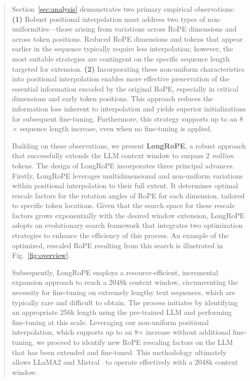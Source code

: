 \begin{abstract}
Section~\ref{sec:analysis} demonstrates two primary empirical observations: \textbf{(1)} Robust positional interpolation must address two types of non-uniformities—those arising from variations across RoPE dimensions and across token positions. Reduced RoPE dimensions and tokens that appear earlier in the sequence typically require less interpolation; however, the most suitable strategies are contingent on the specific sequence length targeted for extension. 
\textbf{(2)} Incorporating these non-uniform characteristics into positional interpolation enables more effective preservation of the essential information encoded by the original RoPE, especially in critical dimensions and early token positions. This approach reduces the information loss inherent to interpolation and yields superior initializations for subsequent fine-tuning. Furthermore, this strategy supports up to an 8$\times$ sequence length increase, even when no fine-tuning is applied.

Building on these observations, we present \textbf{LongRoPE}, a robust approach that successfully extends the LLM context window to surpass 2 \emph{million} tokens. The design of LongRoPE incorporates three principal advances. Firstly, {LongRoPE} leverages multidimensional and non-uniform variations within positional interpolation to their full extent. It determines optimal rescale factors for the rotation angles of RoPE for each dimension, tailored to specific token locations. Given that the search space for these rescale factors grows exponentially with the desired window extension, {LongRoPE} adopts an evolutionary search framework that integrates two optimization strategies to enhance the efficiency of this process. An example of the optimized, rescaled RoPE resulting from this search is illustrated in Fig.~\ref{fig:overview}.

Subsequently, {LongRoPE} employs a resource-efficient, incremental expansion approach to reach a 2048k context window, circumventing the necessity for fine-tuning on extremely lengthy text sequences, which are typically rare and difficult to obtain. The process initiates by identifying an appropriate 256k length using the pre-trained LLM and performing fine-tuning at this scale. Leveraging our non-uniform positional interpolation, which supports up to an 8$\times$ increase without additional fine-tuning, we proceed to identify new RoPE rescaling factors on the LLM that has been extended and fine-tuned. This methodology ultimately allows LLaMA2 and Mistral~\cite{mistral} to operate effectively with a 2048k context window.


\end{abstract}
